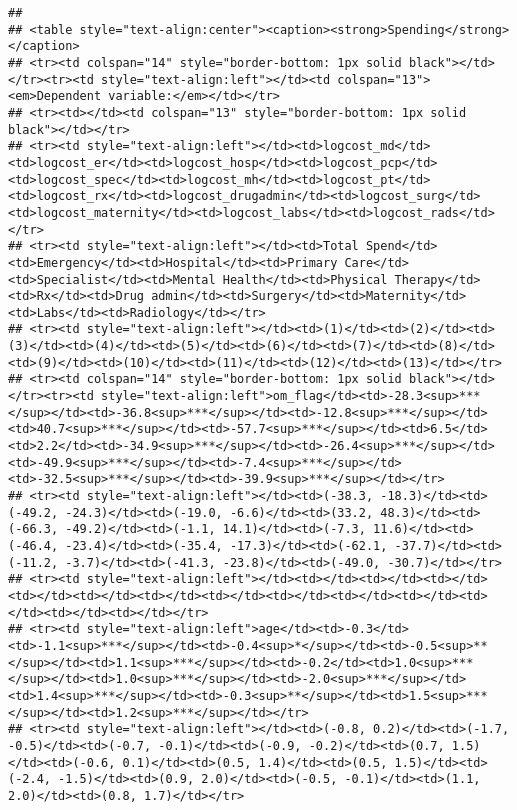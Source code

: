 \documentclass[]{article}
\begin{document}
\begin{verbatim}
## 
## <table style="text-align:center"><caption><strong>Spending</strong></caption>
## <tr><td colspan="14" style="border-bottom: 1px solid black"></td></tr><tr><td style="text-align:left"></td><td colspan="13"><em>Dependent variable:</em></td></tr>
## <tr><td></td><td colspan="13" style="border-bottom: 1px solid black"></td></tr>
## <tr><td style="text-align:left"></td><td>logcost_md</td><td>logcost_er</td><td>logcost_hosp</td><td>logcost_pcp</td><td>logcost_spec</td><td>logcost_mh</td><td>logcost_pt</td><td>logcost_rx</td><td>logcost_drugadmin</td><td>logcost_surg</td><td>logcost_maternity</td><td>logcost_labs</td><td>logcost_rads</td></tr>
## <tr><td style="text-align:left"></td><td>Total Spend</td><td>Emergency</td><td>Hospital</td><td>Primary Care</td><td>Specialist</td><td>Mental Health</td><td>Physical Therapy</td><td>Rx</td><td>Drug admin</td><td>Surgery</td><td>Maternity</td><td>Labs</td><td>Radiology</td></tr>
## <tr><td style="text-align:left"></td><td>(1)</td><td>(2)</td><td>(3)</td><td>(4)</td><td>(5)</td><td>(6)</td><td>(7)</td><td>(8)</td><td>(9)</td><td>(10)</td><td>(11)</td><td>(12)</td><td>(13)</td></tr>
## <tr><td colspan="14" style="border-bottom: 1px solid black"></td></tr><tr><td style="text-align:left">om_flag</td><td>-28.3<sup>***</sup></td><td>-36.8<sup>***</sup></td><td>-12.8<sup>***</sup></td><td>40.7<sup>***</sup></td><td>-57.7<sup>***</sup></td><td>6.5</td><td>2.2</td><td>-34.9<sup>***</sup></td><td>-26.4<sup>***</sup></td><td>-49.9<sup>***</sup></td><td>-7.4<sup>***</sup></td><td>-32.5<sup>***</sup></td><td>-39.9<sup>***</sup></td></tr>
## <tr><td style="text-align:left"></td><td>(-38.3, -18.3)</td><td>(-49.2, -24.3)</td><td>(-19.0, -6.6)</td><td>(33.2, 48.3)</td><td>(-66.3, -49.2)</td><td>(-1.1, 14.1)</td><td>(-7.3, 11.6)</td><td>(-46.4, -23.4)</td><td>(-35.4, -17.3)</td><td>(-62.1, -37.7)</td><td>(-11.2, -3.7)</td><td>(-41.3, -23.8)</td><td>(-49.0, -30.7)</td></tr>
## <tr><td style="text-align:left"></td><td></td><td></td><td></td><td></td><td></td><td></td><td></td><td></td><td></td><td></td><td></td><td></td><td></td></tr>
## <tr><td style="text-align:left">age</td><td>-0.3</td><td>-1.1<sup>***</sup></td><td>-0.4<sup>*</sup></td><td>-0.5<sup>**</sup></td><td>1.1<sup>***</sup></td><td>-0.2</td><td>1.0<sup>***</sup></td><td>1.0<sup>***</sup></td><td>-2.0<sup>***</sup></td><td>1.4<sup>***</sup></td><td>-0.3<sup>**</sup></td><td>1.5<sup>***</sup></td><td>1.2<sup>***</sup></td></tr>
## <tr><td style="text-align:left"></td><td>(-0.8, 0.2)</td><td>(-1.7, -0.5)</td><td>(-0.7, -0.1)</td><td>(-0.9, -0.2)</td><td>(0.7, 1.5)</td><td>(-0.6, 0.1)</td><td>(0.5, 1.4)</td><td>(0.5, 1.5)</td><td>(-2.4, -1.5)</td><td>(0.9, 2.0)</td><td>(-0.5, -0.1)</td><td>(1.1, 2.0)</td><td>(0.8, 1.7)</td></tr>

\end{verbatim}
\end{document}
